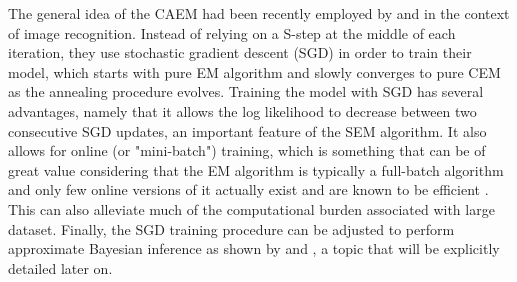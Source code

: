 \documentclass[11pt,letter]{article}
\begin{document}
\par
The general idea of the CAEM had been recently employed by \cite{gepperth_gradient-based_2021} and \cite{gepperth_gradient-based_2020} in the context of image recognition. Instead of relying on a S-step at the middle of each iteration, they use stochastic gradient descent (SGD) in order to train their model, which starts with pure EM algorithm and slowly converges to pure CEM as the annealing procedure evolves. Training the model with SGD has several advantages, namely that it allows the log likelihood to decrease between two consecutive SGD updates, an important feature of the SEM algorithm. It also allows for online (or "mini-batch") training, which is something that can be of great value considering that the EM algorithm is typically a full-batch algorithm and only few online versions of it actually exist and are known to be efficient \citep{cappe_-line_2009}. This can also alleviate much of the computational burden associated with large dataset. Finally, the SGD training procedure can be adjusted to perform approximate Bayesian inference as shown by \cite{mandt_stochastic_2018} and \cite{smith_bayesian_2018}, a topic that will be explicitly detailed later on.
\end{document}
